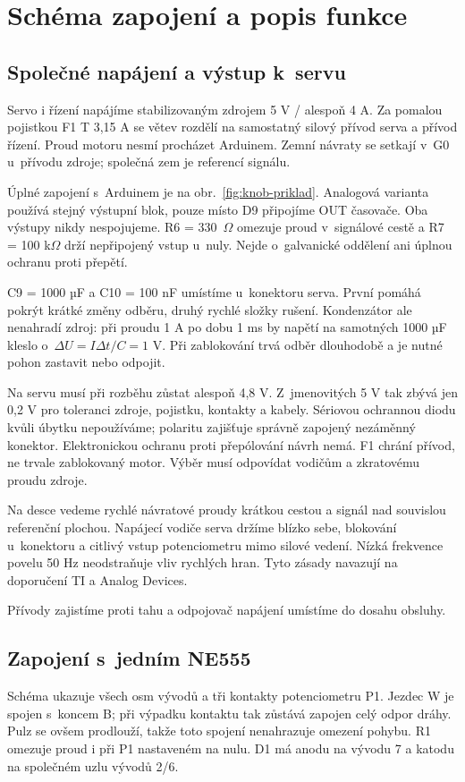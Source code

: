 \chapter{Schéma zapojení a popis funkce}
\label{chap:napajeni}
\section{Společné napájení a výstup k~servu}
Servo i řízení napájíme stabilizovaným zdrojem 5 V / alespoň 4 A. Za pomalou pojistkou F1 T 3,15 A se větev rozdělí na samostatný silový přívod serva a přívod řízení. Proud motoru nesmí procházet Arduinem. Zemní návraty se setkají v~G0 u~přívodu zdroje; společná zem je referencí signálu.

Úplné zapojení s~Arduinem je na obr.~\ref{fig:knob-priklad}. Analogová varianta používá stejný výstupní blok, pouze místo D9 připojíme OUT časovače. Oba výstupy nikdy nespojujeme. R6 = 330~$\Omega$ omezuje proud v~signálové cestě a R7 = 100 k$\Omega$ drží nepřipojený vstup u~nuly. Nejde o~galvanické oddělení ani úplnou ochranu proti přepětí.

C9 = 1000 µF a C10 = 100 nF umístíme u~konektoru serva. První pomáhá pokrýt krátké změny odběru, druhý rychlé složky rušení. Kondenzátor ale nenahradí zdroj: při proudu 1 A po dobu 1 ms by napětí na samotných 1000 µF kleslo o~$\Delta U=I\Delta t/C=1$ V. Při zablokování trvá odběr dlouhodobě a je nutné pohon zastavit nebo odpojit.

Na servu musí při rozběhu zůstat alespoň 4,8 V. Z~jmenovitých 5 V tak zbývá jen 0,2 V pro toleranci zdroje, pojistku, kontakty a kabely. Sériovou ochrannou diodu kvůli úbytku nepoužíváme; polaritu zajišťuje správně zapojený nezáměnný konektor. Elektronickou ochranu proti přepólování návrh nemá. F1 chrání přívod, ne trvale zablokovaný motor. Výběr musí odpovídat vodičům a zkratovému proudu zdroje.

Na desce vedeme rychlé návratové proudy krátkou cestou a signál nad souvislou referenční plochou. Napájecí vodiče serva držíme blízko sebe, blokování u~konektoru a citlivý vstup potenciometru mimo silové vedení. Nízká frekvence povelu 50 Hz neodstraňuje vliv rychlých hran. Tyto zásady navazují na doporučení TI a Analog Devices.~\cite{tiemi,mt031}

Přívody zajistíme proti tahu a odpojovač napájení umístíme do dosahu obsluhy.

\section{Zapojení s~jedním NE555}
Schéma ukazuje všech osm vývodů a tři kontakty potenciometru P1. Jezdec W je spojen s~koncem B; při výpadku kontaktu tak zůstává zapojen celý odpor dráhy. Pulz se ovšem prodlouží, takže toto spojení nenahrazuje omezení pohybu. R1 omezuje proud i při P1 nastaveném na nulu. D1 má anodu na vývodu 7 a katodu na společném uzlu vývodů 2/6.

